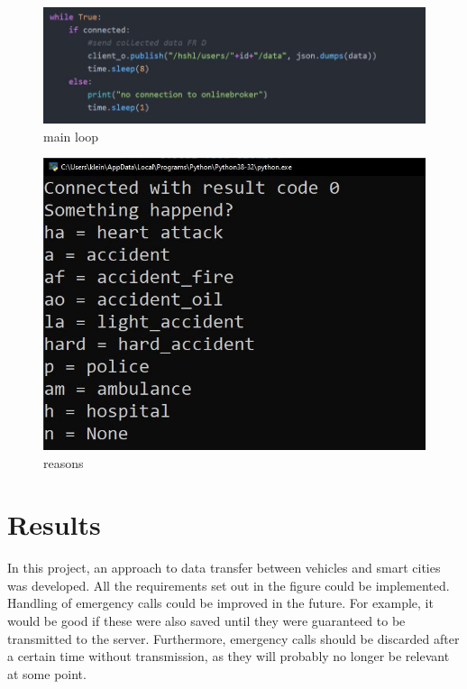 \begin{figure}
\sidecaption
\includegraphics[scale=.5]{images/images_michael/main_loop.JPG}
\caption{main loop}
\label{fig:6}
\end{figure}



\begin{figure}
\sidecaption
\includegraphics[scale=.5]{images/images_michael/reasons.JPG}
\caption{reasons}
\label{fig:8}
\end{figure}
   

\section{Results}
\label{sec:5}
In this project, an approach to data transfer between vehicles and smart cities was developed. All the requirements set out in the figure could be implemented. Handling of emergency calls could be improved in the future. For example, it would be good if these were also saved until they were guaranteed to be transmitted to the server. Furthermore, emergency calls should be discarded after a certain time without transmission, as they will probably no longer be relevant at some point.



\newpage

